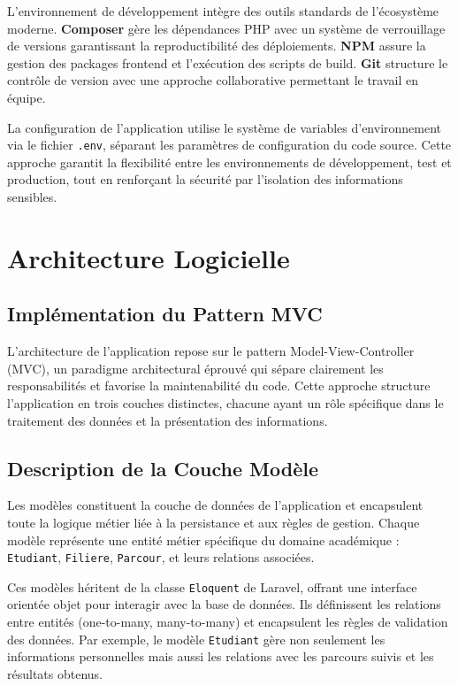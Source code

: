 \documentclass[12pt,a4paper]{report}
\begin{document}
L'environnement de développement intègre des outils standards de l'écosystème moderne. \textbf{Composer} gère les dépendances PHP avec un système de verrouillage de versions garantissant la reproductibilité des déploiements. \textbf{NPM} assure la gestion des packages frontend et l'exécution des scripts de build. \textbf{Git} structure le contrôle de version avec une approche collaborative permettant le travail en équipe.

La configuration de l'application utilise le système de variables d'environnement via le fichier \texttt{.env}, séparant les paramètres de configuration du code source. Cette approche garantit la flexibilité entre les environnements de développement, test et production, tout en renforçant la sécurité par l'isolation des informations sensibles.

\section{Architecture Logicielle}

\subsection{Implémentation du Pattern MVC}

L'architecture de l'application repose sur le pattern Model-View-Controller (MVC), un paradigme architectural éprouvé qui sépare clairement les responsabilités et favorise la maintenabilité du code. Cette approche structure l'application en trois couches distinctes, chacune ayant un rôle spécifique dans le traitement des données et la présentation des informations.

\subsection{Description de la Couche Modèle}

Les modèles constituent la couche de données de l'application et encapsulent toute la logique métier liée à la persistance et aux règles de gestion. Chaque modèle représente une entité métier spécifique du domaine académique : \texttt{Etudiant}, \texttt{Filiere}, \texttt{Parcour}, et leurs relations associées.

Ces modèles héritent de la classe \texttt{Eloquent} de Laravel, offrant une interface orientée objet pour interagir avec la base de données. Ils définissent les relations entre entités (one-to-many, many-to-many) et encapsulent les règles de validation des données. Par exemple, le modèle \texttt{Etudiant} gère non seulement les informations personnelles mais aussi les relations avec les parcours suivis et les résultats obtenus.
\end{document}
